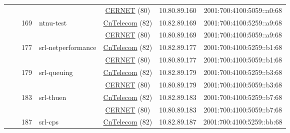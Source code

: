 \begin{small}
\begin{center}
\begin{longtable}{|c|c|c|c|c|c|c|c|}
  &  &  &  & \multicolumn{2}{|c|}{\tiny{\href{http://www.cernet.edu.cn}{CERNET} (80)}} & \tiny{10.80.89.160} & \tiny{2001:700:4100:5059::a0:68} \\* \cline{3-3}\cline{4-4}\cline{5-5}\cline{6-6}\cline{7-7}\cline{8-8}
  &  & \multirow{2}{*}{\tiny{169}} & \multicolumn{1}{|l|}{\multirow{2}{*}{\tiny{ntnu-test}}} & \multicolumn{2}{|c|}{\tiny{\href{http://www.chinatelecom.com.cn}{CnTelecom} (82)}} & \tiny{10.82.89.169} & \tiny{2001:700:4100:5259::a9:68} \\* \cline{5-5}\cline{6-6}\cline{7-7}\cline{8-8}
  &  &  &  & \multicolumn{2}{|c|}{\tiny{\href{http://www.cernet.edu.cn}{CERNET} (80)}} & \tiny{10.80.89.169} & \tiny{2001:700:4100:5059::a9:68} \\* \cline{3-3}\cline{4-4}\cline{5-5}\cline{6-6}\cline{7-7}\cline{8-8}
  &  & \multirow{2}{*}{\tiny{177}} & \multicolumn{1}{|l|}{\multirow{2}{*}{\tiny{srl-netperformance}}} & \multicolumn{2}{|c|}{\tiny{\href{http://www.chinatelecom.com.cn}{CnTelecom} (82)}} & \tiny{10.82.89.177} & \tiny{2001:700:4100:5259::b1:68} \\* \cline{5-5}\cline{6-6}\cline{7-7}\cline{8-8}
  &  &  &  & \multicolumn{2}{|c|}{\tiny{\href{http://www.cernet.edu.cn}{CERNET} (80)}} & \tiny{10.80.89.177} & \tiny{2001:700:4100:5059::b1:68} \\* \cline{3-3}\cline{4-4}\cline{5-5}\cline{6-6}\cline{7-7}\cline{8-8}
  &  & \multirow{2}{*}{\tiny{179}} & \multicolumn{1}{|l|}{\multirow{2}{*}{\tiny{srl-queuing}}} & \multicolumn{2}{|c|}{\tiny{\href{http://www.chinatelecom.com.cn}{CnTelecom} (82)}} & \tiny{10.82.89.179} & \tiny{2001:700:4100:5259::b3:68} \\* \cline{5-5}\cline{6-6}\cline{7-7}\cline{8-8}
  &  &  &  & \multicolumn{2}{|c|}{\tiny{\href{http://www.cernet.edu.cn}{CERNET} (80)}} & \tiny{10.80.89.179} & \tiny{2001:700:4100:5059::b3:68} \\* \cline{3-3}\cline{4-4}\cline{5-5}\cline{6-6}\cline{7-7}\cline{8-8}
  &  & \multirow{2}{*}{\tiny{183}} & \multicolumn{1}{|l|}{\multirow{2}{*}{\tiny{srl-thuen}}} & \multicolumn{2}{|c|}{\tiny{\href{http://www.chinatelecom.com.cn}{CnTelecom} (82)}} & \tiny{10.82.89.183} & \tiny{2001:700:4100:5259::b7:68} \\* \cline{5-5}\cline{6-6}\cline{7-7}\cline{8-8}
  &  &  &  & \multicolumn{2}{|c|}{\tiny{\href{http://www.cernet.edu.cn}{CERNET} (80)}} & \tiny{10.80.89.183} & \tiny{2001:700:4100:5059::b7:68} \\* \cline{3-3}\cline{4-4}\cline{5-5}\cline{6-6}\cline{7-7}\cline{8-8}
  &  & \multirow{2}{*}{\tiny{187}} & \multicolumn{1}{|l|}{\multirow{2}{*}{\tiny{srl-cps}}} & \multicolumn{2}{|c|}{\tiny{\href{http://www.chinatelecom.com.cn}{CnTelecom} (82)}} & \tiny{10.82.89.187} & \tiny{2001:700:4100:5259::bb:68} \\* \cline{5-5}\cline{6-6}\cline{7-7}\cline{8-8}

\end{longtable}
\end{center}
\end{small}
